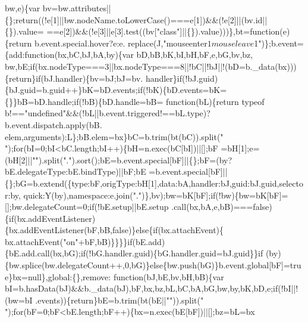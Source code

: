 \begin{DoxyCode}
      bw,e)\{var bv=bw.attributes||\{\};\textcolor{keywordflow}{return}((!e[1]||bw.nodeName.toLowerCase()===e[1])&&(!e[2]||(bv.id||\{\}).value=
      ==e[2])&&(!e[3]||e[3].test((bv[\textcolor{stringliteral}{"class"}]||\{\}).value)))\},bt=\textcolor{keyword}{function}(e)\{\textcolor{keywordflow}{return} b.event.special.hover?e:e.
      replace(J,\textcolor{stringliteral}{"mouseenter$1 mouseleave$1"})\};b.event=\{add:\textcolor{keyword}{function}(bx,bC,bJ,bA,by)\{var bD,bB,bK,bI,bH,bF,e,bG,bv,bz,
      bw,bE;\textcolor{keywordflow}{if}(bx.nodeType===3||bx.nodeType===8||!bC||!bJ||!(bD=b.\_data(bx)))\{\textcolor{keywordflow}{return}\}\textcolor{keywordflow}{if}(bJ.handler)\{bv=bJ;bJ=bv.
      handler\}\textcolor{keywordflow}{if}(!bJ.guid)\{bJ.guid=b.guid++\}bK=bD.events;\textcolor{keywordflow}{if}(!bK)\{bD.events=bK=\{\}\}bB=bD.handle;\textcolor{keywordflow}{if}(!bB)\{bD.handle=bB=\textcolor{keyword}{
      function}(bL)\{\textcolor{keywordflow}{return} typeof b!==\textcolor{stringliteral}{"undefined"}&&(!bL||b.event.triggered!==bL.type)?b.event.dispatch.apply(bB.
      elem,arguments):L\};bB.elem=bx\}bC=b.trim(bt(bC)).split(\textcolor{stringliteral}{" "});\textcolor{keywordflow}{for}(bI=0;bI<bC.length;bI++)\{bH=n.exec(bC[bI])||[];bF
      =bH[1];e=(bH[2]||\textcolor{stringliteral}{""}).split(\textcolor{stringliteral}{"."}).sort();bE=b.event.special[bF]||\{\};bF=(by?bE.delegateType:bE.bindType)||bF;bE
      =b.event.special[bF]||\{\};bG=b.extend(\{type:bF,origType:bH[1],data:bA,handler:bJ,guid:bJ.guid,selector:by,
      quick:Y(by),\textcolor{keyword}{namespace}:e.join(\textcolor{stringliteral}{"."})\},bv);bw=bK[bF];\textcolor{keywordflow}{if}(!bw)\{bw=bK[bF]=[];bw.delegateCount=0;\textcolor{keywordflow}{if}(!bE.setup||bE.setup
      .call(bx,bA,e,bB)===\textcolor{keyword}{false})\{\textcolor{keywordflow}{if}(bx.addEventListener)\{bx.addEventListener(bF,bB,\textcolor{keyword}{false})\}\textcolor{keywordflow}{else}\{\textcolor{keywordflow}{if}(bx.attachEvent)\{
      bx.attachEvent(\textcolor{stringliteral}{"on"}+bF,bB)\}\}\}\}\textcolor{keywordflow}{if}(bE.add)\{bE.add.call(bx,bG);\textcolor{keywordflow}{if}(!bG.handler.guid)\{bG.handler.guid=bJ.guid\}\}\textcolor{keywordflow}{if}
      (by)\{bw.splice(bw.delegateCount++,0,bG)\}\textcolor{keywordflow}{else}\{bw.push(bG)\}b.event.global[bF]=\textcolor{keyword}{true}\}bx=null\},global:\{\},\textcolor{keyword}{remove}:\textcolor{keyword}{
      function}(bJ,bE,bv,bH,bB)\{var bI=b.hasData(bJ)&&b.\_data(bJ),bF,bx,bz,bL,bC,bA,bG,bw,by,bK,bD,e;\textcolor{keywordflow}{if}(!bI||!(bw=bI
      .events))\{\textcolor{keywordflow}{return}\}bE=b.trim(bt(bE||\textcolor{stringliteral}{""})).split(\textcolor{stringliteral}{" "});\textcolor{keywordflow}{for}(bF=0;bF<bE.length;bF++)\{bx=n.exec(bE[bF])||[];bz=bL=bx

\end{DoxyCode}
